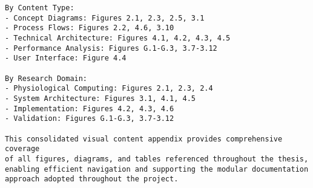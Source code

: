\begin{verbatim}
By Content Type:
- Concept Diagrams: Figures 2.1, 2.3, 2.5, 3.1
- Process Flows: Figures 2.2, 4.6, 3.10
- Technical Architecture: Figures 4.1, 4.2, 4.3, 4.5
- Performance Analysis: Figures G.1-G.3, 3.7-3.12
- User Interface: Figure 4.4

By Research Domain:
- Physiological Computing: Figures 2.1, 2.3, 2.4
- System Architecture: Figures 3.1, 4.1, 4.5
- Implementation: Figures 4.2, 4.3, 4.6
- Validation: Figures G.1-G.3, 3.7-3.12

This consolidated visual content appendix provides comprehensive coverage
of all figures, diagrams, and tables referenced throughout the thesis,
enabling efficient navigation and supporting the modular documentation
approach adopted throughout the project.
\end{verbatim}
